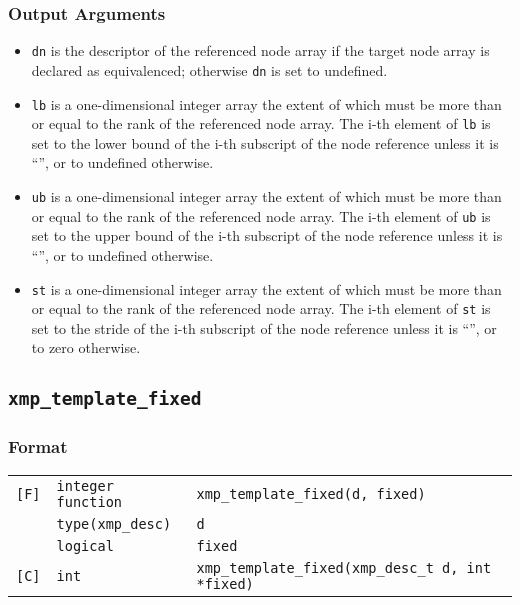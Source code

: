 \subsubsection*{Output Arguments}
\begin{itemize}
 \item {\tt dn} is the descriptor of the referenced node array
       if the target node array is declared as equivalenced; otherwise
       {\tt dn} is set to undefined.
 \item {\tt lb} is a one-dimensional integer array the extent of which
       must be more than or equal to the rank of the referenced node
       array. The i-th element of {\tt lb} is set to the lower bound of
       the i-th subscript of the node reference unless it is ``{\tt *}'',
       or to undefined otherwise.
 \item {\tt ub} is a one-dimensional integer array the extent of which
       must be more than or equal to the rank of the referenced node
       array. The i-th element of {\tt ub} is set to the upper bound of
       the i-th subscript of the node reference unless it is ``{\tt *}'',
       or to undefined otherwise.
 \item {\tt st} is a one-dimensional integer array the extent of which
       must be more than or equal to the rank of the referenced node
       array. The i-th element of {\tt st} is set to the stride of
       the i-th subscript of the node reference unless it is ``{\tt *}'',
       or to zero otherwise.
\end{itemize}


\subsection{\tt xmp\_template\_fixed}

\subsubsection*{Format}

\begin{tabular}{lll}

\verb![F]!& {\tt integer function}& {\tt xmp\_template\_fixed(d, fixed)}\\
          & {\tt type(xmp\_desc)} & {\tt d}\\
          & {\tt logical} & {\tt fixed}\\

\verb![C]!&  {\tt int}& {\tt xmp\_template\_fixed(xmp\_desc\_t d, int *fixed)}\\

\end{tabular}

